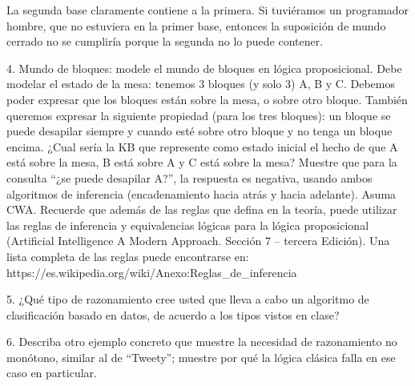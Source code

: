 La segunda base claramente contiene a la primera. Si tuviéramos un programador hombre, que no estuviera en la primer base, entonces la suposición de mundo cerrado no se cumpliría porque la segunda no lo puede contener.


4. Mundo de bloques: modele el mundo de bloques en lógica proposicional. Debe modelar el estado de la mesa: tenemos 3 bloques (y solo 3) A, B y C. Debemos poder expresar que los bloques están sobre la mesa, o sobre otro bloque. También queremos expresar la siguiente propiedad (para los tres bloques): un bloque se puede desapilar siempre y cuando esté sobre otro bloque y no tenga un bloque encima. ¿Cual sería la KB que represente como estado inicial el hecho de que A está sobre la mesa, B está sobre A y C está sobre la mesa? Muestre que para la consulta “¿se puede desapilar A?”, la respuesta es negativa, usando ambos algoritmos de inferencia (encadenamiento hacia atrás y hacia adelante). Asuma CWA. Recuerde que además de las reglas que defina en la teoría, puede utilizar las reglas de inferencia y equivalencias lógicas para la lógica proposicional (Artificial Intelligence A Modern Approach. Sección 7 – tercera Edición). Una lista completa de las reglas puede encontrarse en: https://es.wikipedia.org/wiki/Anexo:Reglas_de_inferencia

5. ¿Qué tipo de razonamiento cree usted que lleva a cabo un algoritmo de clasificación basado en datos, de acuerdo a los tipos vistos en clase?

6. Describa otro ejemplo concreto que muestre la necesidad de razonamiento no monótono, similar al de “Tweety”; muestre por qué la lógica clásica falla en ese caso en particular.


\bigskip